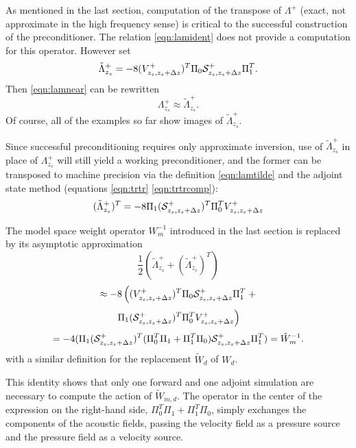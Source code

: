 \documentclass[georeport,12pt]{geophysics}
\begin{document}
As mentioned in the last section, computation of the transpose of
$\Lambda^+$ (exact, not approximate in the high frequency sense) is
critical to the successful construction of the preconditioner. The
relation \ref{eqn:lamident} does not provide a computation for this
operator. However set
\begin{equation}
  \label{eqn:lamtilde}
  \tilde{\Lambda}^+_{z_s} = -8(V^{+}_{z_s,z_s+\Delta z})^T\Pi_0 {\cal
    S}^+_{z_s,z_s+\Delta z}\Pi_1^T.
\end{equation}
Then \ref{eqn:lamnear} can be rewritten
\[
  \Lambda^+_{z_s} \approx \tilde{\Lambda}^+_{z_s}.
\]
Of course, all of the examples so far show images of
$\tilde{\Lambda}^+_{z_s}$.

Since successful preconditioning requires only approximate inversion,
use of $\tilde{\Lambda}^+_{z_s} $ in place of $\Lambda^+_{z_s}$ will
still yield a working preconditioner, and the former can be transposed
to machine precision via the definition \ref{eqn:lamtilde} and the adjoint state
method (equations \ref{eqn:trtr} \ref{eqn:trtrcomp}):
\begin{equation}
  \label{eqn:lamtransp}
  (\tilde{\Lambda}^+_{z_s})^T = -8 \Pi_1 ({\cal S}^+_{z_s,z_s+\Delta
    z})^T\Pi_0^T V^{+}_{z_s,z_s+\Delta z}
\end{equation}


The model space weight operator $W_m^{-1}$ introduced in the last section is
replaced by its asymptotic approximation
\[
\frac{1}{2}(\tilde{\Lambda}^+_{z_s} +
  (\tilde{\Lambda}^+_{z_s})^T)
\]
\[
  \approx -8 \left((V^{+}_{z_s,z_s+\Delta z})^T\Pi_0 {\cal
    S}^+_{z_s,z_s+\Delta z}\Pi_1^T \right.+
\]
\[
  \left. \Pi_1 ({\cal S}^+_{z_s,z_s+\Delta
      z})^T\Pi_0^T V^{+}_{z_s,z_s+\Delta z}\right)
\]
\begin{equation}
  \label{eqn:winvcomp}
  = -4(\Pi_1 ({\cal S}^+_{z_s,z_s+\Delta z})^T(\Pi_0^T\Pi_1 +
  \Pi_1^T\Pi_0) {\cal S}^+_{z_s,z_s+\Delta z}\Pi_1^T) = \tilde{W}_m^{-1} .
\end{equation}
with a similar definition for the replacement $\tilde{W}_d$ of $W_d$.

This identity shows that only one forward and one adjoint simulation
are necessary to compute the action of $\tilde{W}_{m,d}$. The operator
in the center of the expression on the right-hand side, $\Pi_0^T\Pi_1
+ \Pi_1^T\Pi_0$, simply exchanges the components of the acoustic
fields, passing the velocity field as a pressure source and the
pressure field as a velocity source.
\end{document}
